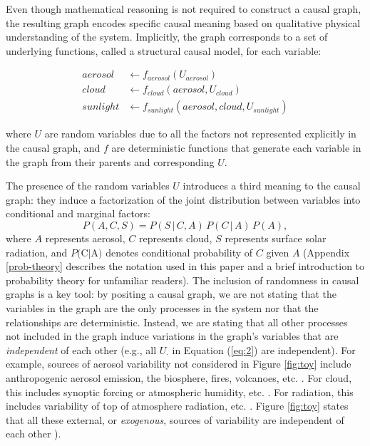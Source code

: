 \documentclass[12pt]{article}
\begin{document}
Even though mathematical reasoning is not required to construct a
causal graph, the resulting graph encodes specific causal meaning
based on qualitative physical understanding of the system. Implicitly,
the graph corresponds to a set of underlying functions, called a
structural causal model, for each variable:

\begin{align}
  \label{eq:2}
  aerosol &\leftarrow f_{aerosol} (U_{aerosol}) \\
  cloud &\leftarrow f_{cloud} (aerosol, U_{cloud})\\
  sunlight &\leftarrow f_{sunlight} (aerosol, cloud, U_{sunlight})
\end{align}

where $U$ are random variables due to all the factors not represented
explicitly in the causal graph, and $f$ are deterministic functions
that generate each variable in the graph from their parents and
corresponding $U$.

The presence of the random variables $U$ introduces a third meaning to
the causal graph: they induce a factorization of the joint
distribution between variables into conditional and marginal factors:
\begin{equation}
  P(A, C, S) = P(S \, | \,C, A) \, P(C \, | \, A) \, P(A),
\end{equation}
where $A$ represents aerosol, $C$ represents cloud, $S$ represents
surface solar radiation, and $P($C$ | $A$)$ denotes conditional
probability of $C$ given $A$ (Appendix \ref{prob-theory} describes the notation used in
this paper and a brief introduction to probability theory for
unfamiliar readers). The inclusion of randomness in causal graphs is a
key tool: by positing a causal graph, we are not stating that the
variables in the graph are the only processes in the system nor that the relationships are deterministic. Instead,
we are stating that all other processes not included in the graph
induce variations in the graph's variables that are \emph{independent} of
each other (e.g., all $U_{\cdot}$ in Equation (\ref{eq:2}) are
independent). For example, sources of aerosol variability not
considered in Figure \ref{fig:toy} include anthropogenic aerosol
emission, the biosphere, fires, volcanoes,
etc. \citep[e.g.,][]{Boucher2015}. For cloud, this includes synoptic
forcing or atmospheric humidity,
etc. \citep[e.g.,][]{wallace2006atmospheric}. For radiation, this
includes variability of top of atmosphere radiation,
etc. \citep[e.g.,][]{hartmann2015global}. Figure \ref{fig:toy} states
that all these external, or \textit{exogenous}, sources of variability
are independent of each other \citep[in very technical terms, this means the
graph is ``\textit{Markovian},''][]{pearl2009causality}).
\end{document}
